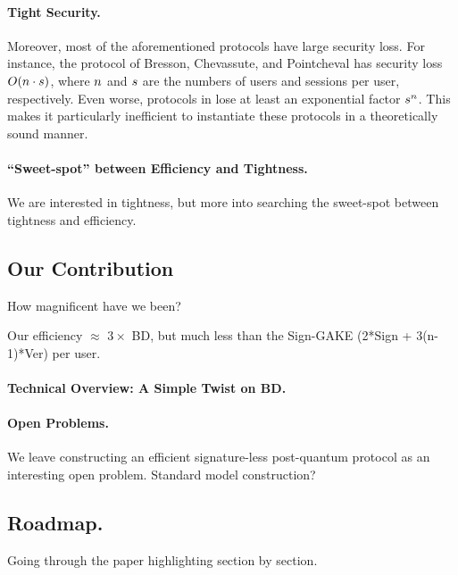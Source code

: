 

\paragraph{Tight Security.}
Moreover, most of the aforementioned protocols have large security loss. For instance, the protocol of Bresson, Chevassute, and Pointcheval \cite{AC:BreChePoi01} has security loss $O(n \cdot s)$, where $n$ and $s$ are the numbers of users and sessions per user, respectively. Even worse, protocols in \cite{CCS:BCPQ01,CANS:LiYan13} lose at least an exponential factor $s^{n}$. This makes it particularly inefficient to instantiate these protocols in a theoretically sound manner.


\paragraph{``Sweet-spot'' between Efficiency and Tightness.}
We are interested in tightness, but more into searching the sweet-spot between tightness and efficiency.


\subsection{Our Contribution}
How magnificent have we been?

Our efficiency $\approx$ $3\times $ BD, but much less than the Sign-GAKE (2*Sign + 3(n-1)*Ver) per user.

\paragraph{Technical Overview: A Simple Twist on BD.}

\paragraph{Open Problems.}
We leave constructing an efficient signature-less post-quantum \introGAKE protocol as an interesting open problem. 
Standard model construction?


\subsection{Roadmap.}
Going through the paper highlighting section by section.
